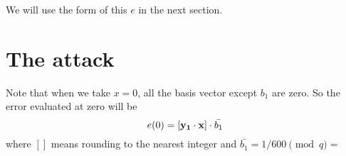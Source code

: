 \documentclass{amsart}
\begin{document}
We will use the form of this $e$ in the next section.

\section{The attack}

Note that when we take $x = 0$, all the basis vector except
$b_1$ are zero. So the error evaluated at zero will be
\[
    e(0) = [{\bf y_1} \cdot {\bf x}] \cdot \bar{b_1}
\]
where $[]$ means rounding to the nearest integer and
$\bar{b_1} = 1/600 \pmod{q} = $
\end{document}
